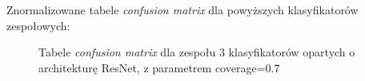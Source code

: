 \documentclass[polish,12pt]{aghthesis}
\begin{document}
\noindent Znormalizowane tabele \textit{confusion matrix} dla powyższych klasyfikatorów zespołowych:
\begin{figure}[h!]%
    \begin{adjustbox}{minipage=1.0\paperwidth, pagecenter}
    \centering
    \qquad
    \end{adjustbox}
    \label{fig:resnet-ens-3-0.7-matrices}
    \caption{Tabele \textit{confusion matrix} dla zespołu 3 klasyfikatorów opartych o architekturę ResNet, z parametrem coverage=0.7}
\end{figure}
\end{document}
